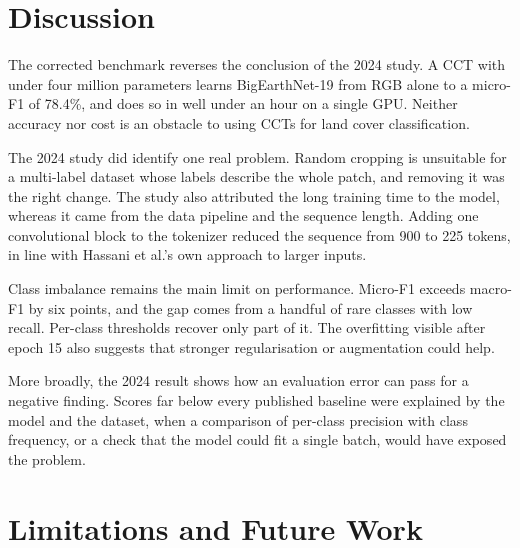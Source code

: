 \documentclass[11pt]{article}
\begin{document}
\section{Discussion}

The corrected benchmark reverses the conclusion of the 2024 study. A CCT with under four million
parameters learns BigEarthNet-19 from RGB alone to a micro-F1 of 78.4\%, and does so in well under an hour
on a single GPU. Neither accuracy nor cost is an obstacle to using CCTs for land cover classification.

The 2024 study did identify one real problem. Random cropping is unsuitable for a multi-label dataset
whose labels describe the whole patch, and removing it was the right change. The study also attributed
the long training time to the model, whereas it came from the data pipeline and the sequence length.
Adding one convolutional block to the tokenizer reduced the sequence from 900 to 225 tokens, in line with
Hassani et al.'s own approach to larger inputs.

Class imbalance remains the main limit on performance. Micro-F1 exceeds macro-F1 by six points, and the
gap comes from a handful of rare classes with low recall. Per-class thresholds recover only part of it.
The overfitting visible after epoch 15 also suggests that stronger regularisation or augmentation could
help.

More broadly, the 2024 result shows how an evaluation error can pass for a negative finding. Scores far
below every published baseline were explained by the model and the dataset, when a comparison of per-class
precision with class frequency, or a check that the model could fit a single batch, would have exposed
the problem.

\section{Limitations and Future Work}
\end{document}
